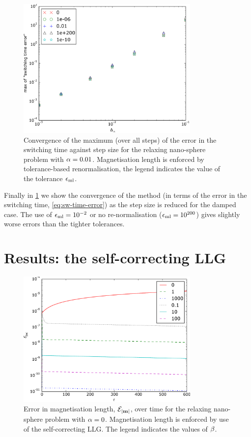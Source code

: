\begin{figure}
  \centering
  \includegraphics[width=0.8\textwidth]{plots/tolrenorm_llg_ode_convergence/maxofswitchingtimeerrorvsmeanofdts}
  \caption{
    Convergence of the maximum (over all steps) of the error in the switching time
    against step size
    for the relaxing nano-sphere problem with
    $\alpha = 0.01$.
    Magnetisation length is enforced by tolerance-based renormalisation,
    the legend indicates the value of the tolerance $\epsilon_{\mathrm{ml}}$.
  }
  \label{fig:tol-renorm-convergence}
\end{figure}

Finally in \cref{fig:tol-renorm-convergence} we show the convergence of the method (in terms of the error in the switching time, \cref{eq:sw-time-error}) as the step size is reduced for the damped case.
The use of $\epsilon_{\mathrm{ml}}=10^{-2}$ or no re-normalisation ($\epsilon_{\mathrm{ml}}=10^{200}$) gives slightly worse errors than the tighter tolerances.


\FloatBarrier
\section{Results: the self-correcting LLG}
\label{sec:self-correcting-llg-results}

\begin{figure}
  \centering
  \includegraphics[width=0.8\textwidth]{plots/sc-geom-properties/0-mlengtherrormaxesvstimes.pdf}
  \caption{
    Error in magnetisation length, $\mathcal{E}_{\left|{\boldsymbol{\mathrm{m}}} \right|}$, over time
    for the relaxing nano-sphere problem
    with $\alpha = 0$.
    Magnetisation length is enforced by use of the self-correcting LLG.
   The legend indicates the values of $\beta$.
  }
  \label{fig:sc-ml-err-undamped}
\end{figure}

